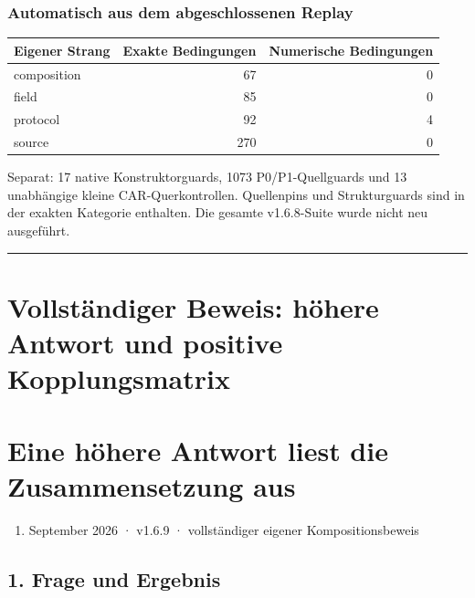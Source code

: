 \subsubsection{Automatisch aus dem abgeschlossenen
Replay}\label{automatisch-aus-dem-abgeschlossenen-replay}

{\def\LTcaptype{none} %
\begin{longtable}[]{@{}lrr@{}}
\toprule\noalign{}
Eigener Strang & Exakte Bedingungen & Numerische Bedingungen \\
\midrule\noalign{}
\endhead
\bottomrule\noalign{}
\endlastfoot
composition & 67 & 0 \\
field & 85 & 0 \\
protocol & 92 & 4 \\
source & 270 & 0 \\
\end{longtable}
}

Separat: 17 native Konstruktorguards, 1073 P0/P1-Quellguards und 13
unabhängige kleine CAR-Querkontrollen. Quellenpins und Strukturguards
sind in der exakten Kategorie enthalten. Die gesamte v1.6.8-Suite wurde
nicht neu ausgeführt.

\begin{center}\rule{0.5\linewidth}{0.5pt}\end{center}

\section{Vollständiger Beweis: höhere Antwort und positive
Kopplungsmatrix}\label{vollstuxe4ndiger-beweis-huxf6here-antwort-und-positive-kopplungsmatrix}

\section{Eine höhere Antwort liest die Zusammensetzung
aus}\label{eine-huxf6here-antwort-liest-die-zusammensetzung-aus}

\begin{enumerate}
\def\labelenumi{\arabic{enumi}.}
\setcounter{enumi}{14}
\tightlist
\item
  September 2026 · v1.6.9 · vollständiger eigener Kompositionsbeweis
\end{enumerate}

\subsection{1. Frage und Ergebnis}\label{frage-und-ergebnis}


